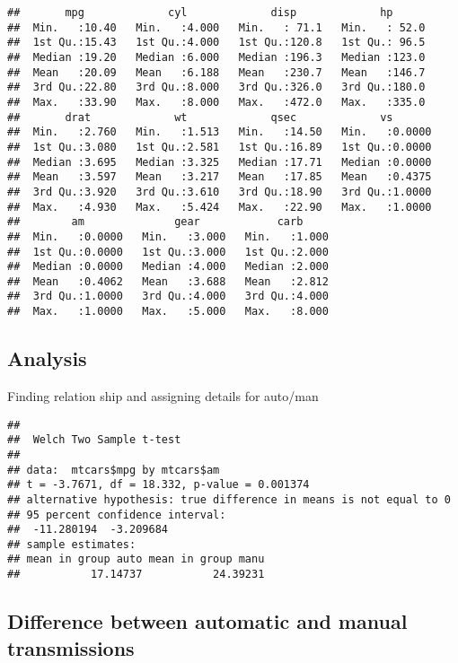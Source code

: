 \documentclass[]{article}
\begin{document}
\begin{verbatim}
##       mpg             cyl             disp             hp       
##  Min.   :10.40   Min.   :4.000   Min.   : 71.1   Min.   : 52.0  
##  1st Qu.:15.43   1st Qu.:4.000   1st Qu.:120.8   1st Qu.: 96.5  
##  Median :19.20   Median :6.000   Median :196.3   Median :123.0  
##  Mean   :20.09   Mean   :6.188   Mean   :230.7   Mean   :146.7  
##  3rd Qu.:22.80   3rd Qu.:8.000   3rd Qu.:326.0   3rd Qu.:180.0  
##  Max.   :33.90   Max.   :8.000   Max.   :472.0   Max.   :335.0  
##       drat             wt             qsec             vs        
##  Min.   :2.760   Min.   :1.513   Min.   :14.50   Min.   :0.0000  
##  1st Qu.:3.080   1st Qu.:2.581   1st Qu.:16.89   1st Qu.:0.0000  
##  Median :3.695   Median :3.325   Median :17.71   Median :0.0000  
##  Mean   :3.597   Mean   :3.217   Mean   :17.85   Mean   :0.4375  
##  3rd Qu.:3.920   3rd Qu.:3.610   3rd Qu.:18.90   3rd Qu.:1.0000  
##  Max.   :4.930   Max.   :5.424   Max.   :22.90   Max.   :1.0000  
##        am              gear            carb      
##  Min.   :0.0000   Min.   :3.000   Min.   :1.000  
##  1st Qu.:0.0000   1st Qu.:3.000   1st Qu.:2.000  
##  Median :0.0000   Median :4.000   Median :2.000  
##  Mean   :0.4062   Mean   :3.688   Mean   :2.812  
##  3rd Qu.:1.0000   3rd Qu.:4.000   3rd Qu.:4.000  
##  Max.   :1.0000   Max.   :5.000   Max.   :8.000
\end{verbatim}

\subsection{Analysis}\label{analysis}

Finding relation ship and assigning details for auto/man

\begin{verbatim}
## 
##  Welch Two Sample t-test
## 
## data:  mtcars$mpg by mtcars$am
## t = -3.7671, df = 18.332, p-value = 0.001374
## alternative hypothesis: true difference in means is not equal to 0
## 95 percent confidence interval:
##  -11.280194  -3.209684
## sample estimates:
## mean in group auto mean in group manu 
##           17.14737           24.39231
\end{verbatim}

\subsection{Difference between automatic and manual
transmissions}\label{difference-between-automatic-and-manual-transmissions}
\end{document}
